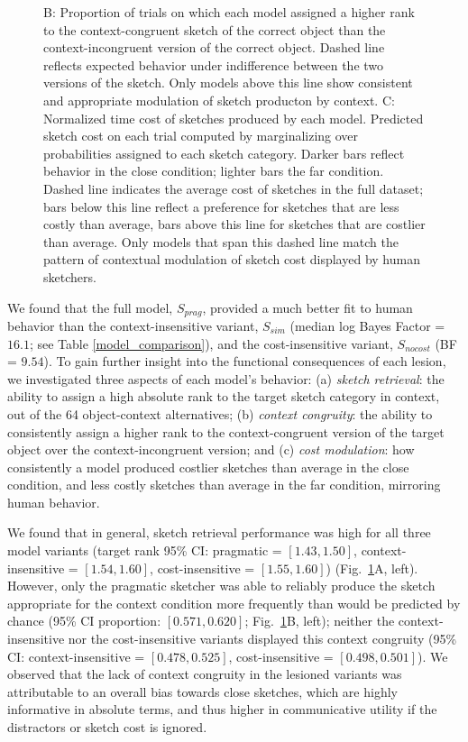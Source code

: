 \documentclass[9pt,twocolumn,twoside]{pnas-new}
\begin{document}
\begin{figure}[htbp]
{B: Proportion of trials on which each model assigned a higher rank to the context-congruent sketch of the correct object than the context-incongruent version of the correct object. 
Dashed line reflects expected behavior under indifference between the two versions of the sketch. 
Only models above this line show consistent and appropriate modulation of sketch producton by context. 
C: Normalized time cost of sketches produced by each model.
Predicted sketch cost on each trial computed by marginalizing over probabilities assigned to each sketch category. 
Darker bars reflect behavior in the close condition; lighter bars the far condition. 
Dashed line indicates the average cost of sketches in the full dataset; bars below this line reflect a preference for sketches that are less costly than average, bars above this line for sketches that are costlier than average. 
Only models that span this dashed line match the pattern of contextual modulation of sketch cost displayed by human sketchers.}
\label{model_results}
\end{figure}

We found that the full model, $S_{prag}$, provided a much better fit to human behavior than the context-insensitive variant, $S_{sim}$ (median log Bayes Factor = $16.1$; see Table \ref{model_comparison}), and the cost-insensitive variant, $S_{nocost}$ (BF = $9.54$).
To gain further insight into the functional consequences of each lesion, we investigated three aspects of each model's behavior: (a) \textit{sketch retrieval}: the ability to assign a high absolute rank to the target sketch category in context, out of the 64 object-context alternatives; (b) \textit{context congruity}: the ability to consistently assign a higher rank to the context-congruent version of the target object over the context-incongruent version; and (c) \textit{cost modulation}: how consistently a model produced costlier sketches than average in the close condition, and less costly sketches than average in the far condition, mirroring human behavior.

We found that in general, sketch retrieval performance was high for all three model variants (target rank 95\% CI: pragmatic = $[1.43, 1.50]$, context-insensitive = $[1.54, 1.60]$, cost-insensitive = $[1.55, 1.60]$) (Fig.~\ref{model_results}A, left).
However, only the pragmatic sketcher was able to reliably produce the sketch appropriate for the context condition more frequently than would be predicted by chance (95\% CI proportion: $[0.571, 0.620]$; Fig.~\ref{model_results}B, left); neither the context-insensitive nor the cost-insensitive variants displayed this context congruity (95\% CI: context-insensitive = $[0.478, 0.525]$, cost-insensitive = $[0.498, 0.501]$). 
We observed that the lack of context congruity in the lesioned variants was attributable to an overall bias towards close sketches, which are highly informative in absolute terms, and thus higher in communicative utility if the distractors or sketch cost is ignored. 
\end{document}
